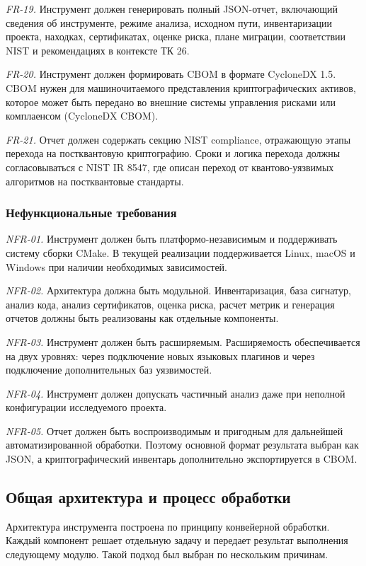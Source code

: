 \documentclass{itmo-vkr}
\begin{document}
	\textit{FR-19.} Инструмент должен генерировать полный JSON-отчет, включающий сведения об инструменте, режиме анализа, исходном пути, инвентаризации проекта, находках, сертификатах, оценке риска, плане миграции, соответствии NIST и рекомендациях в контексте ТК 26.
	
	\textit{FR-20.} Инструмент должен формировать CBOM в формате CycloneDX 1.5. CBOM нужен для машиночитаемого представления криптографических активов, которое может быть передано во внешние системы управления рисками или комплаенсом (CycloneDX CBOM).
	
	\textit{FR-21.} Отчет должен содержать секцию NIST compliance, отражающую этапы перехода на постквантовую криптографию. Сроки и логика перехода должны согласовываться с NIST IR 8547, где описан переход от квантово-уязвимых алгоритмов на постквантовые стандарты.
	
	
	\subsubsection{Нефункциональные требования}
	
	\textit{NFR-01.} Инструмент должен быть платформо-независимым и поддерживать систему сборки CMake. В текущей реализации поддерживается Linux, macOS и Windows при наличии необходимых зависимостей.
	
	\textit{NFR-02.} Архитектура должна быть модульной. Инвентаризация, база сигнатур, анализ кода, анализ сертификатов, оценка риска, расчет метрик и генерация отчетов должны быть реализованы как отдельные компоненты.
	
	\textit{NFR-03.} Инструмент должен быть расширяемым. Расширяемость обеспечивается на двух уровнях: через подключение новых языковых плагинов и через подключение дополнительных баз уязвимостей.
	
	\textit{NFR-04.} Инструмент должен допускать частичный анализ даже при неполной конфигурации исследуемого проекта. 
	
	\textit{NFR-05.} Отчет должен быть воспроизводимым и пригодным для дальнейшей автоматизированной обработки. Поэтому основной формат результата выбран как JSON, а криптографический инвентарь дополнительно экспортируется в CBOM.
	
	\subsection{Общая архитектура и процесс обработки}
	
	Архитектура инструмента построена по принципу конвейерной обработки. Каждый компонент решает отдельную задачу и передает результат выполнения следующему модулю. Такой подход был выбран по нескольким причинам.
	
\end{document}
